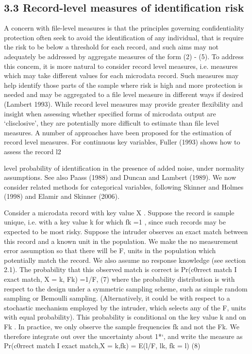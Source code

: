 \subsection*{3.3 Record-level measures of identification risk}
A concern with file-level measures is that the principles governing confidentiality
protection often seek to avoid the identification of any individual, that is require the risk
to be below a threshold for each record, and such aims may not adequately be addressed
by aggregate measures of the form (2) - (5). To address this concem, it is more natural to
consider record level measures, i.e. measures which may take different values for each
microdata record. Such measures may help identify those parts of the sample where risk
is high and more protection is needed and may be aggregated to a file level measure in
different ways if desired (Lambert 1993). While record level measures may provide
greater flexibility and insight when assessing whether specified forms of microdata
output are ‘clisclosive’, they are potentially more difficult to estimate than file level
measures.
A number of approaches have been proposed for the estimation of record level
measures. For continuous key variables, Fuller (1993) shows how to assess the record
l2



level probability of identification in the presence of added noise, under normality
assumptions. See also Paass (1988) and Duncan and Lambert (1989). We now consider
related methods for categorical variables, following Skinner and Holmes (1998) and
Elamir and Skinner (2006).

Consider a microdata record with key value X . Suppose the record is sample unique,
i.e. with a key value k for which fk =1 , since such records may be expected to be most
risky. Suppose the intruder observes an exact match between this record and a known
unit in the population. We make the no measurement error assumption so that there will
be F, units in the population which potentially match the record. We also assume no
response knowledge (see section 2.1). The probability that this observed match is correct
is
Pr(c0rrect match I exact match, X = k, Fk) =1/F, (7)
where the probability distribution is with respect to the design under a symmetric
sampling scheme, such as simple random sampling or Bemoulli sampling. (Alternatively,
it could be with respect to a stochastic mechanism employed by the intruder, which
selects any of the F, units with equal probability). This probability is conditional on the
key value k and on Fk .
In practice, we only observe the sample frequencies fk and not the Fk. We therefore
integrate out over the uncertainty about 1*‘, and write the measure as
Pr(c0rrect match I exact match,X = k,fk) = E(l/F, lk, fk = l) (8)

